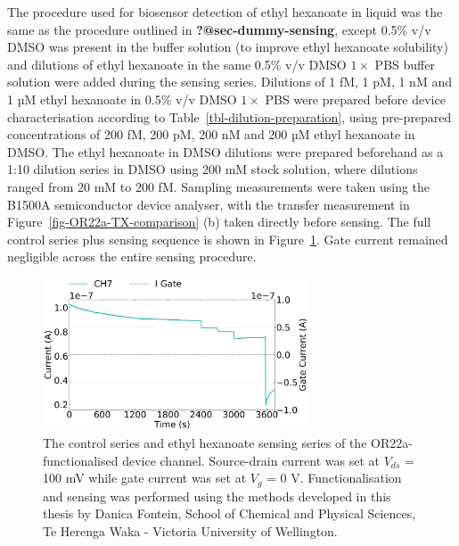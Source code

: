\documentclass[
  a4paper,
]{scrbook}
\begin{document}
The procedure used for biosensor detection of ethyl hexanoate in liquid
was the same as the procedure outlined in \textbf{?@sec-dummy-sensing},
except 0.5\% v/v DMSO was present in the buffer solution (to improve
ethyl hexanoate solubility) and dilutions of ethyl hexanoate in the same
0.5\% v/v DMSO \(1 \times\) PBS buffer solution were added during the
sensing series. Dilutions of 1 fM, 1 pM, 1 nM and 1 µM ethyl hexanoate
in 0.5\% v/v DMSO \(1 \times\) PBS were prepared before device
characterisation according to Table~\ref{tbl-dilution-preparation},
using pre-prepared concentrations of 200 fM, 200 pM, 200 nM and 200 µM
ethyl hexanoate in DMSO. The ethyl hexanoate in DMSO dilutions were
prepared beforehand as a 1:10 dilution series in DMSO using 200 mM stock
solution, where dilutions ranged from 20 mM to 200 fM. Sampling
measurements were taken using the B1500A semiconductor device analyser,
with the transfer measurement in Figure~\ref{fig-OR22a-TX-comparison}
(b) taken directly before sensing. The full control series plus sensing
sequence is shown in Figure~\ref{fig-EtHex-aqueous-sensing}. Gate
current remained negligible across the entire sensing procedure.

\begin{figure}

{\centering \includegraphics[width=0.7\textwidth,height=\textheight]{figures/ch8/Q1C6.png}

}

\caption{\label{fig-EtHex-aqueous-sensing}The control series and ethyl
hexanoate sensing series of the OR22a-functionalised device channel.
Source-drain current was set at \(V_{ds}\) = 100 mV while gate current
was set at \(V_g\) = 0 V. Functionalisation and sensing was performed
using the methods developed in this thesis by Danica Fontein, School of
Chemical and Physical Sciences, Te Herenga Waka - Victoria University of
Wellington.}

\end{figure}
\end{document}
